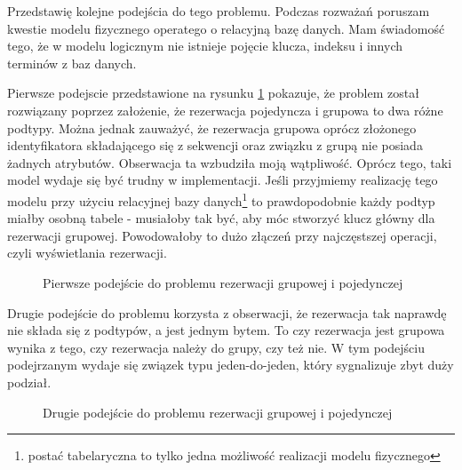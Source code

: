 \documentclass[a4paper,onecolumn,oneside,11pt,wide,floatssmall]{mwrep}
\theoremstyle{definition}
\theoremstyle{plain}%
\theoremstyle{remark}
\begin{document}
Przedstawię kolejne podejścia do tego problemu. Podczas rozważań poruszam kwestie modelu fizycznego operatego o relacyjną bazę danych. Mam świadomość tego, że w modelu logicznym nie istnieje pojęcie klucza, indeksu i innych terminów z baz danych. 

Pierwsze podejscie przedstawione na rysunku \ref{fig:db-logical-model-group-reservation-first-try} pokazuje, że problem został rozwiązany poprzez założenie, że rezerwacja pojedyncza i grupowa to dwa różne podtypy. Można jednak zauważyć, że rezerwacja grupowa oprócz złożonego identyfikatora składającego się z sekwencji oraz związku z grupą nie posiada żadnych atrybutów. Obserwacja ta wzbudziła moją wątpliwość. Oprócz tego, taki model wydaje się być trudny w implementacji. Jeśli przyjmiemy realizację tego modelu przy użyciu relacyjnej bazy danych\footnote{postać tabelaryczna to tylko jedna możliwość realizacji modelu fizycznego} to prawdopodobnie każdy podtyp miałby osobną tabele - musiałoby tak być, aby móc stworzyć klucz główny dla rezerwacji grupowej. Powodowałoby to dużo złączeń przy najczęstszej operacji, czyli wyświetlania rezerwacji.

\begin{figure}[H]
  \begin{center}
  \end{center}
  \caption{Pierwsze podejście do problemu rezerwacji grupowej i pojedynczej}
  \label{fig:db-logical-model-group-reservation-first-try}
\end{figure}

Drugie podejście do problemu korzysta z obserwacji, że rezerwacja tak naprawdę nie składa się z podtypów, a jest jednym bytem. To czy rezerwacja jest grupowa wynika z tego, czy rezerwacja należy do grupy, czy też nie. W tym podejściu podejrzanym wydaje się związek typu jeden-do-jeden, który sygnalizuje zbyt duży podział. 

\begin{figure}[H]
  \begin{center}
  \end{center}
  \caption{Drugie podejście do problemu rezerwacji grupowej i pojedynczej}
  \label{fig:db-logical-model-group-reservation-second-try}
\end{figure}
\end{document}
